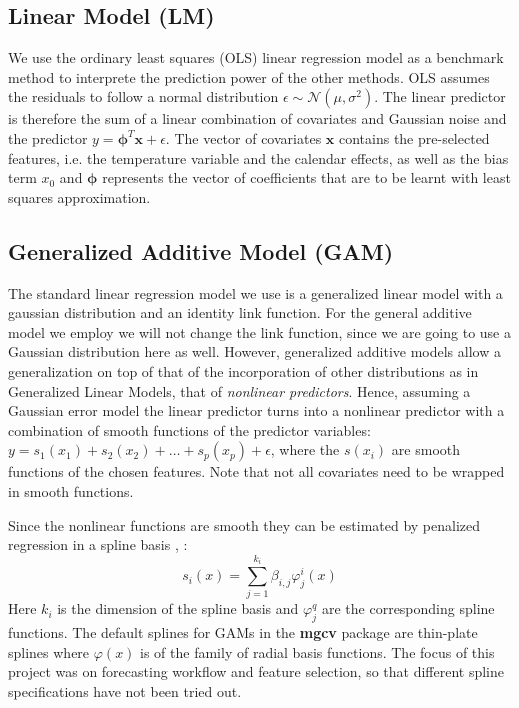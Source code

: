\documentclass[conference]{IEEEtran}
\renewcommand{\vec}[1]{\mathbf{#1}}
\begin{document}
\subsection{Linear Model (LM)}
We use the ordinary least squares (OLS) linear regression model as a benchmark method to interprete the prediction power of the other methods. OLS assumes the residuals to follow a normal distribution $\epsilon \sim \mathcal{N}(\mu, \sigma^2)$. The linear predictor is therefore the sum of a linear combination of covariates and Gaussian noise and the predictor $y = \vec{\phi}^T \vec{x} + \epsilon$. The vector of covariates $\vec{x}$ contains the pre-selected features, i.e. the temperature variable and the calendar effects, as well as the bias term $x_0$ and $\vec{\phi}$ represents the vector of coefficients that are to be learnt with least squares approximation.

\subsection{Generalized Additive Model (GAM)}
The standard linear regression model we use is a generalized linear model with a gaussian distribution and an identity link function. For the general additive model we employ \cite{Wood2006} we will not change the link function, since we are going to use a Gaussian distribution here as well. However, generalized additive models allow a generalization on top of that of the incorporation of other distributions as in Generalized Linear Models, that of \emph{nonlinear predictors}. Hence, assuming a Gaussian error model the linear predictor turns into a nonlinear predictor with a combination of smooth functions of the predictor variables: $y=s_1(x_1)+s_2(x_2)+\dots+s_p(x_p)+\epsilon$, where the $s(x_i)$ are smooth functions of the chosen features. Note that not all covariates need to be wrapped in smooth functions.\par
Since the nonlinear functions are smooth they can be estimated by penalized regression in a spline basis \cite{Nedellec2014}, \cite{GAMS}:
\[
  s_i(x)=\sum_{j=1}^{k_i}\beta_{i,j}\varphi_j^i(x)
\]
Here $k_i$ is the dimension of the spline basis and $\varphi_j^q$ are the corresponding spline functions. The default splines for GAMs in the \textbf{mgcv} package are thin-plate splines \cite{Wood2003} where $\varphi(x)$ is of the family of radial basis functions. The focus of this project was on forecasting workflow and feature selection, so that different spline specifications have not been tried out.\par
\end{document}
